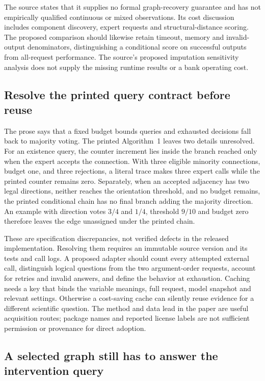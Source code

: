The source states that it supplies no formal graph-recovery guarantee and has
not empirically qualified continuous or mixed observations. Its cost discussion
includes component discovery, expert requests and structural-distance scoring.
The proposed comparison should likewise retain timeout, memory and invalid-
output denominators, distinguishing a conditional score on successful outputs
from all-request performance. The source's proposed imputation sensitivity
analysis does not supply the missing runtime results or a bank operating cost.

\subsection{Resolve the printed query contract before reuse}
\label{exec20:expert-budget}

The prose says that a fixed budget bounds queries and exhausted decisions fall
back to majority voting. The printed Algorithm~1 leaves two details unresolved.
For an existence query, the counter increment lies inside the branch reached
only when the expert accepts the connection. With three eligible minority
connections, budget one, and three rejections, a literal trace makes three
expert calls while the printed counter remains zero. Separately, when an
accepted adjacency has two legal directions, neither reaches the orientation
threshold, and no budget remains, the printed conditional chain has no final
branch adding the majority direction. An example with direction votes
$3/4$ and $1/4$, threshold $9/10$ and budget zero therefore leaves the edge
unassigned under the printed chain. \citep{exec20_expert_averaging_reference}

These are specification discrepancies, not verified defects in the released
implementation. Resolving them requires an immutable source version and its
tests and call logs. A proposed adapter should count every attempted external
call, distinguish logical questions from the two argument-order requests,
account for retries and invalid answers, and define the behavior at exhaustion.
Caching needs a key that binds the variable meanings, full request, model
snapshot and relevant settings. Otherwise a cost-saving cache can silently
reuse evidence for a different scientific question. The method and data lead
in the paper are useful acquisition routes; package names and reported license
labels are not sufficient permission or provenance for direct adoption.

\subsection{A selected graph still has to answer the intervention query}
\label{exec20:expert-identification}

